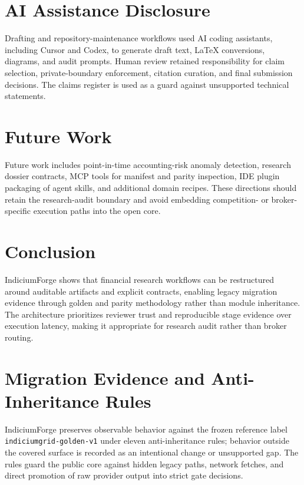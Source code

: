 \documentclass[11pt]{article}
\newcommand{\schema}[1]{\texttt{#1}}
\begin{document}
\section{AI Assistance Disclosure}

Drafting and repository-maintenance workflows used AI coding assistants, including Cursor and
Codex, to generate draft text, LaTeX conversions, diagrams, and audit prompts. Human review
retained responsibility for claim selection, private-boundary enforcement, citation curation,
and final submission decisions. The claims register is used as a guard against unsupported
technical statements.

\section{Future Work}

Future work includes point-in-time accounting-risk anomaly detection, research dossier
contracts, MCP tools for manifest and parity inspection, IDE plugin packaging of agent skills,
and additional domain recipes. These directions should retain the research-audit boundary and
avoid embedding competition- or broker-specific execution paths into the open core.

\section{Conclusion}

IndiciumForge shows that financial research workflows can be restructured around auditable
artifacts and explicit contracts, enabling legacy migration evidence through golden and parity
methodology rather than module inheritance. The architecture prioritizes reviewer trust and
reproducible stage evidence over execution latency, making it appropriate for research audit
rather than broker routing.


\appendix
\section{Migration Evidence and Anti-Inheritance Rules}
\label{app:migration}

IndiciumForge preserves observable behavior against the frozen reference label
\schema{indiciumgrid-golden-v1} under eleven anti-inheritance rules; behavior outside the
covered surface is recorded as an intentional change or unsupported gap. The rules guard the
public core against hidden legacy paths, network fetches, and direct promotion of raw provider
output into strict gate decisions.
\end{document}
